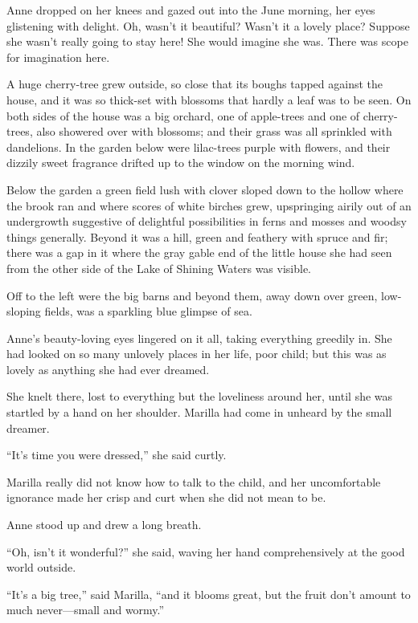 \documentclass[a4paper]{article}
\begin{document}
\small{Anne dropped on her knees and gazed out into the June morning, her eyes glistening with delight. Oh, wasn't it beautiful? Wasn't it a lovely place? Suppose she wasn't really going to stay here! She would imagine she was. There was scope for imagination here.}

A huge cherry-tree grew outside, so close that its boughs tapped against the house, and it was so thick-set with blossoms that hardly a leaf was to be seen. On both sides of the house was a big orchard, one of apple-trees and one of cherry-trees, also showered over with blossoms; and their grass was all sprinkled with dandelions. In the garden below were lilac-trees purple with flowers, and their dizzily sweet fragrance drifted up to the window on the morning wind.

Below the garden a green field lush with clover sloped down to the hollow where the brook ran and where scores of white birches grew, upspringing airily out of an undergrowth suggestive of delightful possibilities in ferns and mosses and woodsy things generally. Beyond it was a hill, green and feathery with spruce and fir; there was a gap in it where the gray gable end of the little house she had seen from the other side of the Lake of Shining Waters was visible.

\normalsize{Off to the left were the big barns and beyond them, away down over green, low-sloping fields, was a sparkling blue glimpse of sea.}

Anne's beauty-loving eyes lingered on it all, taking everything greedily in. She had looked on so many unlovely places in her life, poor child; but this was as lovely as anything she had ever dreamed.

She knelt there, lost to everything but the loveliness around her, until she was startled by a hand on her shoulder. Marilla had come in unheard by the small dreamer.

\large{``It's time you were dressed,'' she said curtly.}

Marilla really did not know how to talk to the child, and her uncomfortable ignorance made her crisp and curt when she did not mean to be.

Anne stood up and drew a long breath.

\Large{``Oh, isn't it wonderful?'' she said, waving her hand comprehensively at the good world outside.}

``It's a big tree,'' said Marilla, ``and it blooms great, but the fruit don't amount to much never---small and wormy.''
\end{document}

